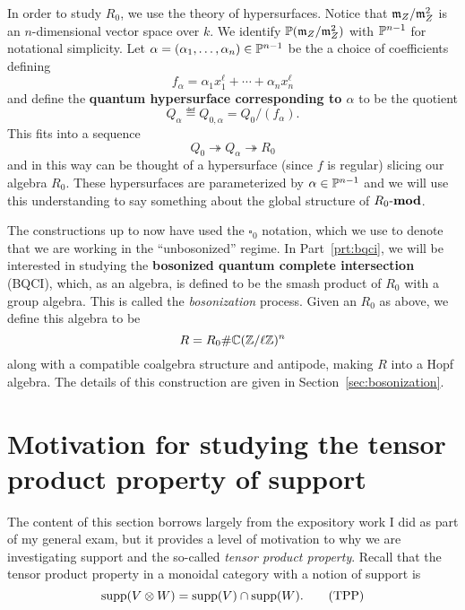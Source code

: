 \documentclass [11pt, proquest] {uwthesis}[2020/02/24]
\begin{document}
    In order to study $R_0$, we use the theory of hypersurfaces. Notice that $\mathfrak{m}_Z/\mathfrak{m}_Z^2$ is an $n$-dimensional vector space over $k$. We identify $\mathbb{P}(\mathfrak{m}_Z/\mathfrak{m}_Z^2)$ with $\mathbb{P}^{n-1}$ for notational simplicity. Let $\alpha=(\alpha_1,\dots,\alpha_n)\in \mathbb{P}^{n-1}$ be the a choice of coefficients defining
    \[f_\alpha = \alpha_1x_1^\ell+\cdots+\alpha_nx_n^\ell\]
    and define the \textbf{quantum hypersurface corresponding to $\alpha$} to be the quotient
    \[Q_\alpha\eqdef Q_{0,\alpha}=Q_0/(f_\alpha).\]
    This fits into a sequence
    \[
        Q_0\twoheadrightarrow Q_\alpha \twoheadrightarrow R_0\label{eq:hypersurface} \tag{HS}
    \]
    and in this way can be thought of a hypersurface (since $f$ is regular) slicing our algebra $R_0$. These hypersurfaces are parameterized by $\alpha\in\mathbb{P}^{n-1}$ and we will use this understanding to say something about the global structure of $R_0\text{-}\mathbf{mod}$.
    
    The constructions up to now have used the $\square_0$ notation, which we use to denote that we are working in the ``unbosonized'' regime. In Part~\ref{prt:bqci}, we will be interested in studying the \textbf{bosonized quantum complete intersection} (BQCI), which, as an algebra, is defined to be the smash product of $R_0$ with a group algebra. This is called the \textit{bosonization} process. Given an $R_0$ as above, we define this algebra to be
    \[R = R_0 \# \mathbb{C}(\mathbb{Z}/\ell\mathbb{Z})^n\]
    along with a compatible coalgebra structure and antipode, making $R$ into a Hopf algebra. The details of this construction are given in Section~\ref{sec:bosonization}.

\section{Motivation for studying the tensor product property of support}
    The content of this section borrows largely from the expository work I did as part of my general exam, but it provides a level of motivation to why we are investigating support and the so-called \textit{tensor product property}. Recall that the tensor product property in a monoidal category with a notion of support is 
    \[\operatorname{supp}(V\otimes W)=\operatorname{supp}(V)\cap\operatorname{supp}(W).\label{eq:tensor-product-property} \tag{TPP}\]
    
\end{document}
